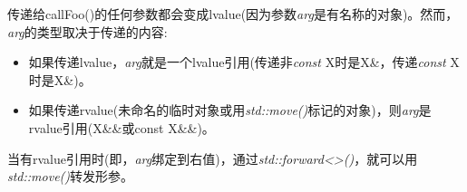 传递给callFoo()的任何参数都会变成lvalue(因为参数\textit{arg}是有名称的对象)。然而，\textit{arg}的类型取决于传递的内容:

\begin{itemize}
	\item 如果传递lvalue，\textit{arg}就是一个lvalue引用(传递非\textit{const} X时是X\&，传递\textit{const} X时是X\&)。
	\item 如果传递rvalue(未命名的临时对象或用\textit{std::move()}标记的对象)，则\textit{arg}是rvalue引用(X\&\&或const X\&\&)。
\end{itemize}

当有rvalue引用时(即，\textit{arg}绑定到右值)，通过\textit{std::forward<>()}，就可以用\textit{std::move()}转发形参。




















